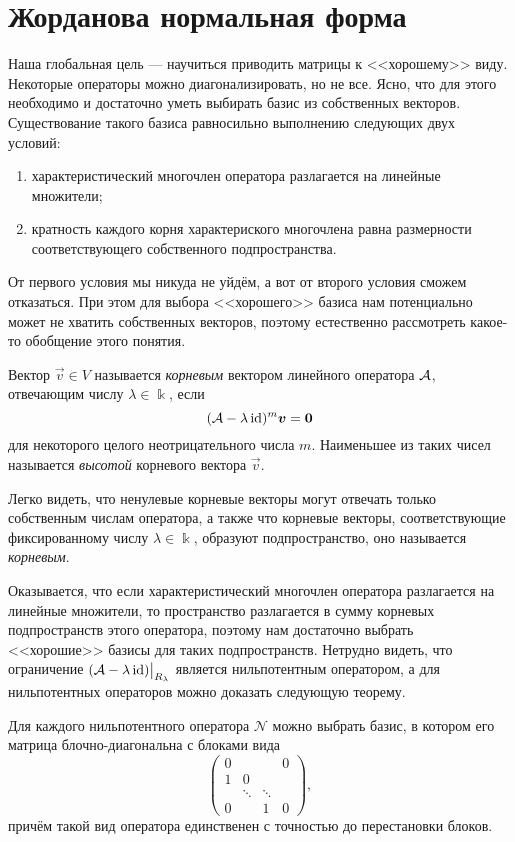 \section{Жорданова нормальная форма}

Наша глобальная цель --- научиться приводить матрицы к <<хорошему>> виду. Некоторые операторы можно диагонализировать, но не все. Ясно, что для этого необходимо и достаточно уметь выбирать базис из собственных векторов. Существование такого базиса равносильно выполнению следующих двух условий:

\begin{enumerate}[nolistsep, label=(\arabic*)]
	\item характеристический многочлен оператора разлагается на линейные множители;
	\item кратность каждого корня характериского многочлена равна размерности соответствующего собственного подпространства.
\end{enumerate}

От первого условия мы никуда не уйдём, а вот от второго условия сможем отказаться. При этом для выбора <<хорошего>> базиса нам потенциально может не хватить собственных векторов, поэтому естественно рассмотреть какое-то обобщение этого понятия.

\begin{definition}
	Вектор $\vec{v} \in V$ называется \textit{корневым} вектором линейного оператора $\mathcal{A}$, отвечающим числу $\lambda \in \Bbbk$, если
	\[
		(\mathcal{A} - \lambda\operatorname{id})^m\boldsymbol{v} = \boldsymbol{0}
	\]
	для некоторого целого неотрицательного числа $m$. Наименьшее из таких чисел называется \textit{высотой} корневого вектора $\vec{v}$.
\end{definition}

Легко видеть, что ненулевые корневые векторы могут отвечать только собственным числам оператора, а также что корневые векторы, соответствующие фиксированному числу $\lambda \in \Bbbk$, образуют подпространство, оно называется \textit{корневым}.

Оказывается, что если характеристический многочлен оператора разлагается на линейные множители, то пространство разлагается в сумму корневых подпространств этого оператора, поэтому нам достаточно выбрать <<хорошие>> базисы для таких подпространств. Нетрудно видеть, что ограничение $(\mathcal{A} - \lambda\operatorname{id})\big|_{R_\lambda}$ является нильпотентным оператором, а для нильпотентных операторов можно доказать следующую теорему.

\begin{theorem} \label{theorem:NilpotentNormalForm}
	Для каждого нильпотентного оператора $\mathcal{N}$ можно выбрать базис, в котором его матрица блочно-диагональна с блоками вида
	\begin{equation} \label{eq:NilpotentBlock}
		\begin{pmatrix}
			0 & & & 0 \\
			1 & 0 & & \\
			 & \ddots & \ddots & \\
			0 & & 1 & 0
		\end{pmatrix},
	\end{equation}
	причём такой вид оператора единственен с точностью до перестановки блоков.
\end{theorem}

